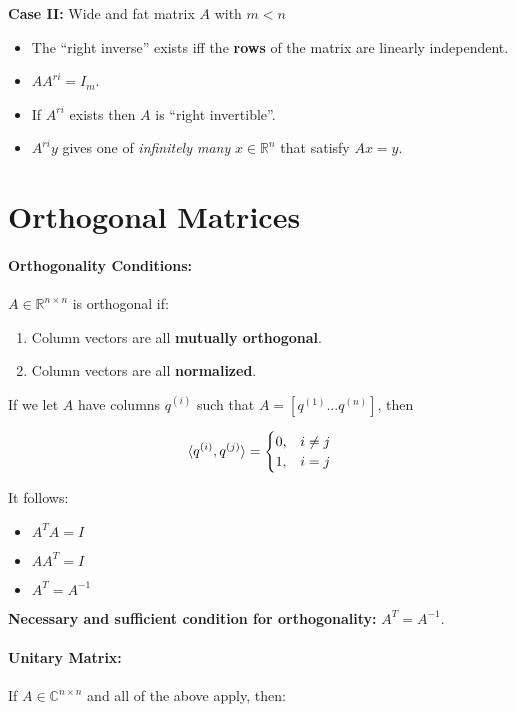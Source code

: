 \documentclass[a4paper,12pt]{report}
\DeclarePairedDelimiter\inpr{\langle}{\rangle}%
\def\reals{\mathbb{R}}
\begin{document}
\textbf{Case II: } Wide and fat matrix $A$ with $m < n$
\begin{itemize}
\item The ``right inverse'' exists iff the \textbf{rows} of the matrix are linearly independent.
\item $A A^{ri} = I_m$.
\item If $A^{ri}$ exists then $A$ is ``right invertible''.
\item $A^{ri} y$ gives one of \textit{infinitely many} $x\in \reals^n$ that satisfy $Ax = y$.
\end{itemize}



\section{Orthogonal Matrices}

\paragraph{Orthogonality Conditions: } $A\in \reals^{n\times n}$ is orthogonal if:
\begin{enumerate}
\item Column vectors are all \textbf{mutually orthogonal}.
\item Column vectors are all \textbf{normalized}.
\end{enumerate}

If we let $A$ have columns $q^{(i)}$ such that $A = [q^{(1)} ... q^{(n)}]$, then

\begin{equation}
\inpr{q^{(i)}, q^{(j)}} = \begin{cases}
0, & i \neq j \\
1, & i = j 
\end{cases}
\end{equation}

It follows: 
\begin{itemize}
\item $A^TA = I$
\item $AA^T = I$
\item $A^T = A^{-1}$
\end{itemize}

\textbf{Necessary and sufficient condition for orthogonality: } $A^T = A^{-1}$.

\paragraph{Unitary Matrix: } If $A\in \mathbb{C}^{n\times n}$ and all of the above apply, then: 
\end{document}
